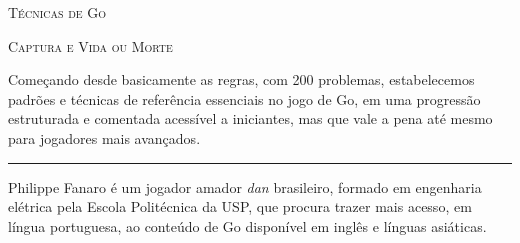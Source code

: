 \documentclass[12pt]{book}
\begin{document}
  \begin{titlepage}
    \setlength\parindent{0ex}

    \begin{center}
      \LARGE{\scshape Técnicas de Go}
      
      \vspace*{0.3cm}
      
      \large{\scshape Captura e Vida ou Morte}
    \end{center}
    
    \vspace*{0.9cm}
    
    Começando desde basicamente as regras, com 200 problemas, estabelecemos padrões e técnicas de referência essenciais no jogo de Go, em uma progressão estruturada e comentada acessível a iniciantes, mas que vale a pena até mesmo para jogadores mais avançados.

    \vspace*{0.1cm}

    \noindent\rule[0.1pt]{\linewidth}{0.25pt}

    \vspace*{0.325cm}

    Philippe Fanaro é um jogador amador \emph{dan} brasileiro, formado em engenharia elétrica pela Escola Politécnica da USP, que procura trazer mais acesso, em língua portuguesa, ao conteúdo de Go disponível em inglês e línguas asiáticas.
  \end{titlepage}
\end{document}
